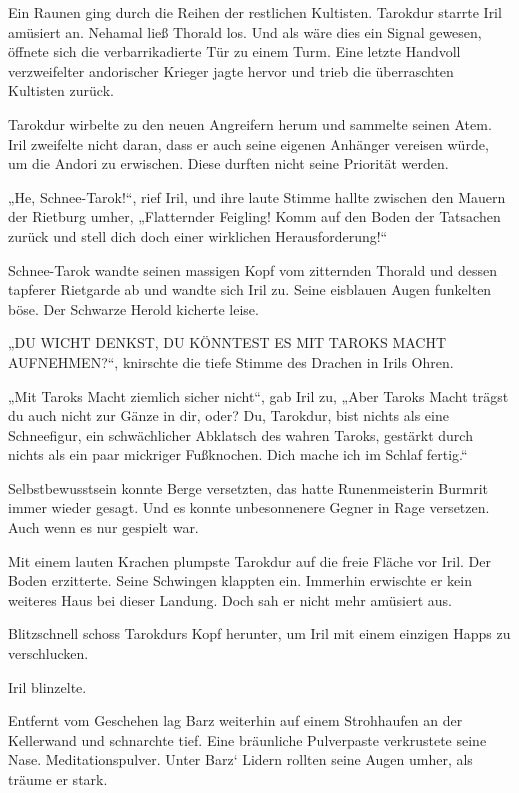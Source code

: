Ein Raunen ging durch die Reihen der restlichen Kultisten. Tarokdur starrte Iril amüsiert an. Nehamal ließ Thorald los. Und als wäre dies ein Signal gewesen, öffnete sich die verbarrikadierte Tür zu einem Turm. Eine letzte Handvoll verzweifelter andorischer Krieger jagte hervor und trieb die überraschten Kultisten zurück.

Tarokdur wirbelte zu den neuen Angreifern herum und sammelte seinen Atem. Iril zweifelte nicht daran, dass er auch seine eigenen Anhänger vereisen würde, um die Andori zu erwischen. Diese durften nicht seine Priorität werden.

„He, Schnee-Tarok!“, rief Iril, und ihre laute Stimme hallte zwischen den Mauern der Rietburg umher, „Flatternder Feigling! Komm auf den Boden der Tatsachen zurück und stell dich doch einer wirklichen Herausforderung!“

Schnee-Tarok wandte seinen massigen Kopf vom zitternden Thorald und dessen tapferer Rietgarde ab und wandte sich Iril zu. Seine eisblauen Augen funkelten böse. Der Schwarze Herold kicherte leise.

„DU WICHT DENKST, DU KÖNNTEST ES MIT TAROKS MACHT AUFNEHMEN?“, knirschte die tiefe Stimme des Drachen in Irils Ohren.

„Mit Taroks Macht ziemlich sicher nicht“, gab Iril zu, „Aber Taroks Macht trägst du auch nicht zur Gänze in dir, oder? Du, Tarokdur, bist nichts als eine Schneefigur, ein schwächlicher Abklatsch des wahren Taroks, gestärkt durch nichts als ein paar mickriger Fußknochen. Dich mache ich im Schlaf fertig.“

Selbstbewusstsein konnte Berge versetzten, das hatte Runenmeisterin Burmrit immer wieder gesagt. Und es konnte unbesonnenere Gegner in Rage versetzen. Auch wenn es nur gespielt war.

Mit einem lauten Krachen plumpste Tarokdur auf die freie Fläche vor Iril. Der Boden erzitterte. Seine Schwingen klappten ein. Immerhin erwischte er kein weiteres Haus bei dieser Landung. Doch sah er nicht mehr amüsiert aus.

Blitzschnell schoss Tarokdurs Kopf herunter, um Iril mit einem einzigen Happs zu verschlucken.

Iril blinzelte.



\trennzeichen



Entfernt vom Geschehen lag Barz weiterhin auf einem Strohhaufen an der Kellerwand und schnarchte tief. Eine bräunliche Pulverpaste verkrustete seine Nase. Meditationspulver. Unter Barz‘ Lidern rollten seine Augen umher, als träume er stark.

